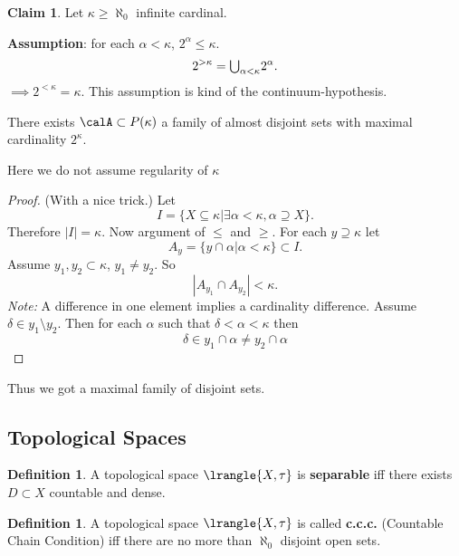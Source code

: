 \documentclass[11pt,pdftex,twoside,a4paper]{article}
\newcommand{\B}[1]{\textbf{#1}}
\newcommand{\ccc}{c.c.c.}
\theoremstyle{definition}
\newtheorem{ldef}[thm]{Definition}
\newtheorem{claim}[thm]{Claim}
\begin{document}
\begin{claim}
Let \(\kappa \geq \aleph_0\) infinite cardinal.

\B{Assumption}: for each \(\alpha < \kappa\), \(2^\alpha \leq \kappa\).
\begin{equation*}
2^{>\kappa} = \mathsmaller{\bigcup_{\alpha < \kappa}}2^\alpha.
\end{equation*}
\(\implies 2^{<\kappa} = \kappa\).
This assumption is kind of the continuum-hypothesis.

There exists \(\calA \subset P(\kappa)\) a family of almost disjoint sets
with maximal cardinality \(2^\kappa\).
\end{claim}
Here we do not assume regularity of \(\kappa\)
\begin{proof}
(With a nice trick.)
Let
\begin{equation*}
I = \{X \subseteq \kappa | \exists \alpha < \kappa, \alpha \supseteq X\}.
\end{equation*}
Therefore \(|I| = \kappa\).
Now argument of \(\leq\) and \(\geq\).
For each \(y \supseteq \kappa\) let
\begin{equation*}
A_y = \{y \cap \alpha | \alpha < \kappa\} \subset I.
\end{equation*}
Assume \(y_1,y_2 \subset \kappa\), \(y_1 \neq y_2\).
So 
\begin{equation*}
 |A_{y_1} \cap A_{y_2}| < \kappa.
\end{equation*}
\emph{Note:} A difference in one element implies a cardinality difference.
Assume \(\delta \in y_1 \setminus y_2\). Then for each \(\alpha\)
such that \(\delta < \alpha < \kappa\) then
\begin{equation*}
 \delta \in y_1\cap \alpha \neq y_2 \cap \alpha
\end{equation*}
\end{proof}
Thus we got a maximal family of disjoint sets.

\subsection{Topological Spaces}

\begin{ldef}
A topological space \(\lrangle{X, \tau}\) is \B{separable}
iff there exists \(D\subset X\) countable and dense.
\end{ldef}

\begin{ldef}
A topological space \(\lrangle{X, \tau}\) is called \B{\ccc} 
(Countable Chain Condition) iff there are no more than \(\aleph_0\)
disjoint open sets.
\end{ldef}
\end{document}

